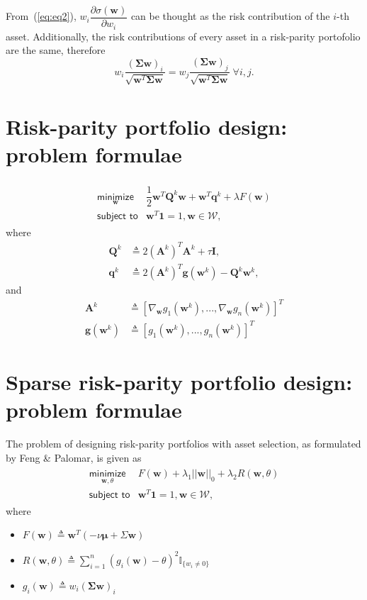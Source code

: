 \documentclass{article}
\begin{document}
From~(\ref{eq:eq2}), $w_{i}\dfrac{\partial \sigma(\bm{w})}{\partial w_i}$ can be
thought as the risk contribution of the $i$-th asset. Additionally, the risk
contributions of every asset in a risk-parity portofolio are the same, therefore
\begin{equation}
w_i \dfrac{(\bm{\Sigma}{\bm{w}})_{i}}{\sqrt{\bm{w}^{T}\bm{\Sigma}\bm{w}}} =
w_j \dfrac{(\bm{\Sigma}{\bm{w}})_{j}}{\sqrt{\bm{w}^{T}\bm{\Sigma}\bm{w}}}~\forall i, j.
\end{equation}

\section{Risk-parity portfolio design: problem formulae}
\begin{align}\begin{array}{ll}
    \underset{\bm{w}}{\textsf{minimize}} & \dfrac{1}{2}\bm{w}^{T}\bm{Q}^{k}\bm{w} +
    \bm{w}^{T}\bm{q}^{k} + \lambda F(\bm{w})\\
\textsf{subject to} & \bm{w}^{T}\bm{1} = 1, \bm{w} \in \mathcal{W},
\end{array}\end{align}
where
\begin{align}
    \bm{Q}^{k} & \triangleq 2(\bm{A}^{k})^{T}\bm{A}^{k} + \tau \bm{I},\\
    \bm{q}^{k} & \triangleq 2(\bm{A}^{k})^{T}\bm{g}(\bm{w}^{k}) - \bm{Q}^{k}\bm{w}^{k},
\end{align}
and
\begin{align}
    \bm{A}^{k} & \triangleq \left[\nabla_{\bm{w}} g_{1}\left(\bm{w}^{k}\right), ...,
                                \nabla_{\bm{w}} g_{n}\left(\bm{w}^{k}\right)\right]^{T} \\
    \bm{g}\left(\bm{w}^{k}\right) & \triangleq \left[g_{1}\left(\bm{w}^{k}\right), ...,
                                                   g_{n}\left(\bm{w}^{k}\right)\right]^{T}
\end{align}


\section{Sparse risk-parity portfolio design: problem formulae}
The problem of designing risk-parity portfolios with asset selection, as formulated by Feng \& Palomar,
is given as
\begin{align}\begin{array}{ll}
\underset{\bm{w}, \theta}{\textsf{minimize}} & F(\bm{w}) + \lambda_{1}||\bm{w}||_{0} + \lambda_{2}R(\bm{w}, \theta)\\
\textsf{subject to} & \bm{w}^{T}\bm{1} = 1, \bm{w} \in \mathcal{W},
\end{array}\end{align}
where
\begin{itemize}
    \item $F(\bm{w}) \triangleq \bm{w}^{T}(- \nu \bm{\mu} + \Sigma\bm{w})$
    \item $R(\bm{w}, \theta) \triangleq \sum_{i=1}^{n}(g_i(\bm{w}) - \theta)^{2}\mathbb{I}_{\{w_i \neq 0\}}$
    \item $g_i(\bm{w}) \triangleq w_i\left(\bm{\Sigma}\bm{w}\right)_{i}$
\end{itemize}
\end{document}
